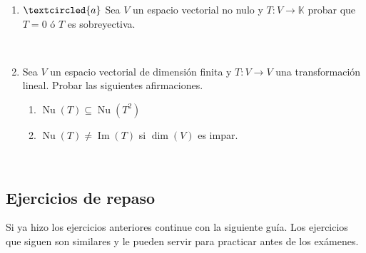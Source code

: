 \documentclass[12pt]{amsart}
\begin{document}
\begin{enumerate}[resume, topsep=5pt,itemsep=5pt]
\begin{enumerate}
\end{enumerate}



\

\item\label{funcionales} $\textcircled{a}$ Sea $V$ un espacio vectorial no nulo y $T:V\longrightarrow\mathbb{K}$ probar que $T=0$ \'o $T$ es sobreyectiva.
   
\
 
    \item Sea $V$ un espacio vectorial de dimensi\'on finita y $T:V\longrightarrow V$ una transformaci\'on lineal. Probar las siguientes afirmaciones.
    \begin{multicols}{2}
     \begin{enumerate}
    \item $\operatorname{Nu}(T)\subseteq\operatorname{Nu}(T^2)$
    \item\label{dimV impar} $\operatorname{Nu}(T)\neq\operatorname{Im}(T)$ si $\dim(V)$ es impar.
    \end{enumerate}
\end{multicols}
      
\end{enumerate}

\

\subsection*{Ejercicios de repaso}
Si ya hizo los ejercicios anteriores continue con la siguiente gu\'ia. Los ejercicios que siguen son similares y le pueden servir para practicar antes de los ex\'amenes.
\end{document}
